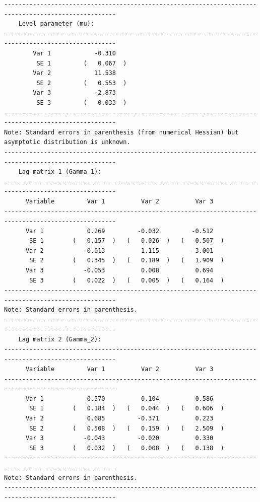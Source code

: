 \documentclass[10pt]{article}
\begin{document}
\begin{verbatim}
-----------------------------------------------------------------------------------------------------
    Level parameter (mu):                                                                         
-----------------------------------------------------------------------------------------------------
        Var 1            -0.310     
         SE 1         (   0.067  )  
        Var 2            11.538     
         SE 2         (   0.553  )  
        Var 3            -2.873     
         SE 3         (   0.033  )  
-----------------------------------------------------------------------------------------------------
Note: Standard errors in parenthesis (from numerical Hessian) but asymptotic distribution is unknown. 
-----------------------------------------------------------------------------------------------------
    Lag matrix 1 (Gamma_1):                                                                            
-----------------------------------------------------------------------------------------------------
      Variable         Var 1          Var 2          Var 3   
-----------------------------------------------------------------------------------------------------
      Var 1            0.269         -0.032         -0.512    
       SE 1        (   0.157  )   (   0.026  )   (   0.507  )  
      Var 2           -0.013          1.115         -3.001    
       SE 2        (   0.345  )   (   0.189  )   (   1.909  )  
      Var 3           -0.053          0.008          0.694    
       SE 3        (   0.022  )   (   0.005  )   (   0.164  )  
-----------------------------------------------------------------------------------------------------
Note: Standard errors in parenthesis.                                                                
-----------------------------------------------------------------------------------------------------
    Lag matrix 2 (Gamma_2):                                                                            
-----------------------------------------------------------------------------------------------------
      Variable         Var 1          Var 2          Var 3   
-----------------------------------------------------------------------------------------------------
      Var 1            0.570          0.104          0.586    
       SE 1        (   0.184  )   (   0.044  )   (   0.606  )  
      Var 2            0.685         -0.371          0.223    
       SE 2        (   0.508  )   (   0.159  )   (   2.509  )  
      Var 3           -0.043         -0.020          0.330    
       SE 3        (   0.032  )   (   0.008  )   (   0.138  )  
-----------------------------------------------------------------------------------------------------
Note: Standard errors in parenthesis.                                                                
-----------------------------------------------------------------------------------------------------


\end{verbatim}
\end{document}
